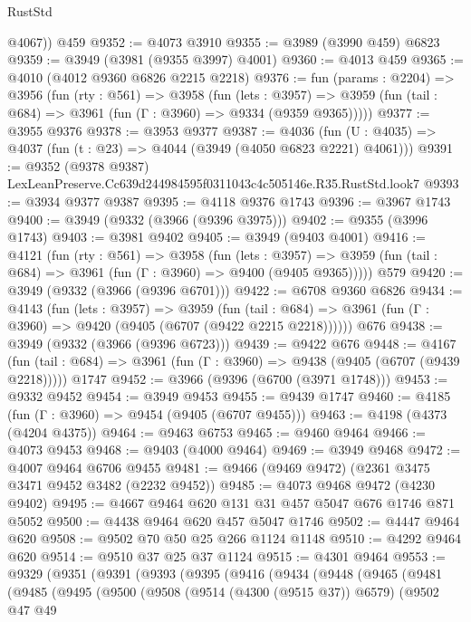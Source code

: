 \begin{lexlean}{RustStd}
\begin{coremodule}
        @4067))
    @459
@9352 := @4073 @3910
@9355 := @3989 (@3990 @459) @6823
@9359 := @3949 (@3981 (@9355 @3997) @4001)
@9360 := @4013 @459
@9365 := @4010 (@4012 @9360 @6826 @2215 @2218)
@9376 := fun (params : @2204) =>
  @3956
    (fun (rty : @561) =>
    @3958
      (fun (lets : @3957) =>
      @3959 (fun (tail : @684) => @3961 (fun (Γ : @3960) => @9334 (@9359 @9365)))))
@9377 := @3955 @9376
@9378 := @3953 @9377
@9387 := @4036 (fun (U : @4035) => @4037 (fun (t : @23) => @4044 (@3949 (@4050 @6823 @2221) @4061)))
@9391 := @9352 (@9378 @9387) LexLeanPreserve.Cc639d244984595f0311043c4c505146e.R35.RustStd.look7
@9393 := @3934 @9377 @9387
@9395 := @4118 @9376 @1743
@9396 := @3967 @1743
@9400 := @3949 (@9332 (@3966 (@9396 @3975)))
@9402 := @9355 (@3996 @1743)
@9403 := @3981 @9402
@9405 := @3949 (@9403 @4001)
@9416 := @4121
    (fun (rty : @561) =>
    @3958
      (fun (lets : @3957) =>
      @3959 (fun (tail : @684) => @3961 (fun (Γ : @3960) => @9400 (@9405 @9365)))))
    @579
@9420 := @3949 (@9332 (@3966 (@9396 @6701)))
@9422 := @6708 @9360 @6826
@9434 := @4143
    (fun (lets : @3957) =>
    @3959
      (fun (tail : @684) => @3961 (fun (Γ : @3960) => @9420 (@9405 (@6707 (@9422 @2215 @2218))))))
    @676
@9438 := @3949 (@9332 (@3966 (@9396 @6723)))
@9439 := @9422 @676
@9448 := @4167
    (fun (tail : @684) => @3961 (fun (Γ : @3960) => @9438 (@9405 (@6707 (@9439 @2218)))))
    @1747
@9452 := @3966 (@9396 (@6700 (@3971 @1748)))
@9453 := @9332 @9452
@9454 := @3949 @9453
@9455 := @9439 @1747
@9460 := @4185 (fun (Γ : @3960) => @9454 (@9405 (@6707 @9455)))
@9463 := @4198 (@4373 (@4204 @4375))
@9464 := @9463 @6753
@9465 := @9460 @9464
@9466 := @4073 @9453
@9468 := @9403 (@4000 @9464)
@9469 := @3949 @9468
@9472 := @4007 @9464 @6706 @9455
@9481 := @9466 (@9469 @9472) (@2361 @3475 @3471 @9452 @3482 (@2232 @9452))
@9485 := @4073 @9468 @9472 (@4230 @9402)
@9495 := @4667 @9464 @620 @131 @31 @457 @5047 @676 @1746 @871 @5052
@9500 := @4438 @9464 @620 @457 @5047 @1746
@9502 := @4447 @9464 @620
@9508 := @9502 @70 @50 @25 @266 @1124 @1148
@9510 := @4292 @9464 @620
@9514 := @9510 @37 @25 @37 @1124
@9515 := @4301 @9464
@9553 := @9329
    (@9351
      (@9391
        (@9393
          (@9395
            (@9416
              (@9434
                (@9448
                  (@9465
                    (@9481
                      (@9485
                        (@9495
                          (@9500
                            (@9508
                              (@9514 (@4300 (@9515 @37)) @6579)
                              (@9502
                                @47
                                @49

\end{coremodule}
\end{lexlean}
